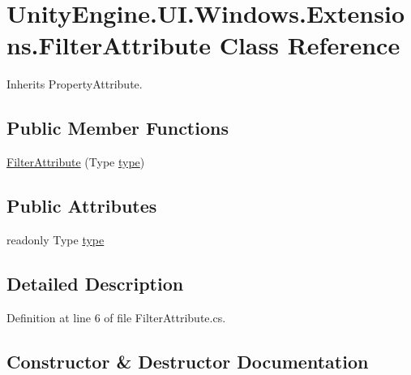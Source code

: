 \hypertarget{class_unity_engine_1_1_u_i_1_1_windows_1_1_extensions_1_1_filter_attribute}{}\section{Unity\+Engine.\+U\+I.\+Windows.\+Extensions.\+Filter\+Attribute Class Reference}
\label{class_unity_engine_1_1_u_i_1_1_windows_1_1_extensions_1_1_filter_attribute}


Inherits Property\+Attribute.

\subsection*{Public Member Functions}
\begin{DoxyCompactItemize}
\item 
\hyperlink{class_unity_engine_1_1_u_i_1_1_windows_1_1_extensions_1_1_filter_attribute_a83582e09682f0f831b4cf7cbefb0a84b}{Filter\+Attribute} (Type \hyperlink{class_unity_engine_1_1_u_i_1_1_windows_1_1_extensions_1_1_filter_attribute_a7709d4709fa48b9d58751277264dfefe}{type})
\end{DoxyCompactItemize}
\subsection*{Public Attributes}
\begin{DoxyCompactItemize}
\item 
readonly Type \hyperlink{class_unity_engine_1_1_u_i_1_1_windows_1_1_extensions_1_1_filter_attribute_a7709d4709fa48b9d58751277264dfefe}{type}
\end{DoxyCompactItemize}


\subsection{Detailed Description}


Definition at line 6 of file Filter\+Attribute.\+cs.



\subsection{Constructor \& Destructor Documentation}
\hypertarget{class_unity_engine_1_1_u_i_1_1_windows_1_1_extensions_1_1_filter_attribute_a83582e09682f0f831b4cf7cbefb0a84b}{}
